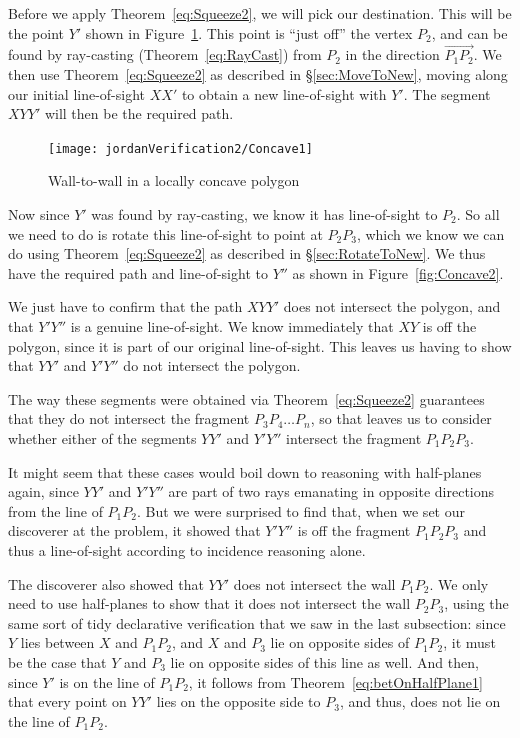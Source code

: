 Before we apply Theorem~\ref{eq:Squeeze2}, we will pick our destination. This will be the point $Y'$ shown in Figure~\ref{fig:Concave1}. This point is ``just off'' the vertex $P_2$, and can be found by ray-casting (Theorem~\ref{eq:RayCast}) from $P_2$ in the direction $\overrightarrow{P_1P_2}$. We then use Theorem~\ref{eq:Squeeze2} as described in \S\ref{sec:MoveToNew}, moving along our initial line-of-sight $XX'$ to obtain a new line-of-sight with $Y'$. The segment $XYY'$ will then be the required path.

\begin{figure}
\centering\texttt{[image: jordanVerification2/Concave1]}
\caption{Wall-to-wall in a locally concave polygon}
\label{fig:Concave1}
\end{figure}

Now since $Y'$ was found by ray-casting, we know it has line-of-sight to $P_2$. So all we need to do is rotate this line-of-sight to point at $P_2P_3$, which we know we can do using Theorem~\ref{eq:Squeeze2} as described in \S\ref{sec:RotateToNew}. We thus have the required path and line-of-sight to $Y''$ as shown in Figure~\ref{fig:Concave2}.

We just have to confirm that the path $XYY'$ does not intersect the polygon, and that $Y'Y''$ is a genuine line-of-sight. We know immediately that $XY$ is off the polygon, since it is part of our original line-of-sight. This leaves us having to show that $YY'$ and $Y'Y''$ do not intersect the polygon. 

The way these segments were obtained via Theorem~\ref{eq:Squeeze2} guarantees that they do not intersect the fragment $P_3P_4\ldots P_n$, so that leaves us to consider whether either of the segments $YY'$ and $Y'Y''$ intersect the fragment $P_1P_2P_3$. 

It might seem that these cases would boil down to reasoning with half-planes again, since $YY'$ and $Y'Y''$ are part of two rays emanating in opposite directions from the line of $P_1P_2$. But we were surprised to find that, when we set our discoverer at the problem, it showed that $Y'Y''$ is off the fragment $P_1P_2P_3$ and thus a line-of-sight according to incidence reasoning alone.

The discoverer also showed that $YY'$ does not intersect the wall $P_1P_2$. We only need to use half-planes to show that it does not intersect the wall $P_2P_3$, using the same sort of tidy declarative verification that we saw in the last subsection: since $Y$ lies between $X$ and $P_1P_2$, and $X$ and $P_3$ lie on opposite sides of $P_1P_2$, it must be the case that $Y$ and $P_3$ lie on opposite sides of this line as well. And then, since $Y'$ is on the line of $P_1P_2$, it follows from Theorem~\ref{eq:betOnHalfPlane1} that every point on $YY'$ lies on the opposite side to $P_3$, and thus, does not lie on the line of $P_1P_2$. 

